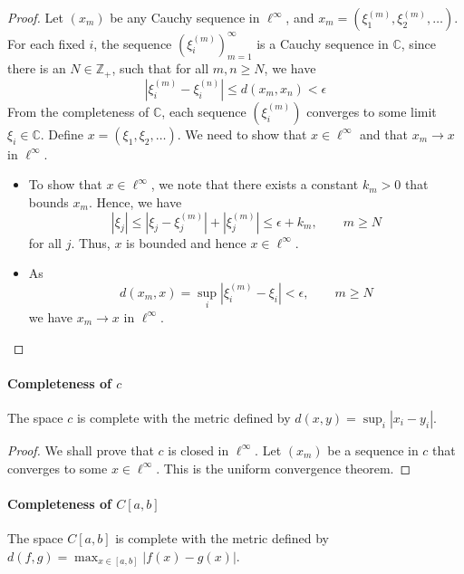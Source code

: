 \documentclass[../main.tex]{subfiles}
\begin{document}
\begin{proof}
	Let $(x_m)$ be any Cauchy sequence in $\ell^{\infty }$, and $x_m = (\xi_1^{(m)}, \xi_2^{(m)}, \ldots)$. For each fixed $i$, the sequence $(\xi_i^{(m)})_{m=1}^\infty$ is a Cauchy sequence in $\mathbb{C}$, since there is an $N\in \mathbb{Z}_+$, such that for all $m, n \geq N$, we have
	\begin{equation*}
		|\xi_i^{(m)} - \xi_i^{(n)}| \leq d(x_m, x_n) < \epsilon
	\end{equation*}
	From the completeness of $\mathbb{C}$, each sequence $(\xi_i^{(m)})$ converges to some limit $\xi_i \in \mathbb{C}$. Define $x = (\xi_1, \xi_2, \ldots)$. We need to show that $x \in \ell^{\infty }$ and that $x_m \to x$ in $\ell^{\infty }$.
	\begin{itemize}
		\item To show that $x \in \ell^{\infty }$, we note that there exists a constant $k_m>0$ that bounds $x_m$. Hence, we have
			\begin{equation*}
				|\xi_j| \leq |\xi_j-\xi_j^{(m)}| + |\xi_j^{(m)}| \leq \epsilon + k_m, \qquad m \geq N
			\end{equation*}
			for all $j$. Thus, $x$ is bounded and hence $x \in \ell^{\infty }$.
		\item As
			\begin{equation*}
				d(x_m, x) = \sup_{i} |\xi_i^{(m)} - \xi_i| < \epsilon, \qquad m \geq N
			\end{equation*}
			we have $x_m \to x$ in $\ell^{\infty }$.
	\end{itemize}
\end{proof}


\paragraph{Completeness of $c$} The space $c$ is complete with the metric defined by $d(x, y) = \sup_{i} |x_i - y_i|$.

\begin{proof}
	We shall prove that $c$ is closed in $\ell^{\infty }$. Let $(x_m)$ be a sequence in $c$ that converges to some $x \in \ell^{\infty }$. This is the uniform convergence theorem.
\end{proof}

\paragraph{Completeness of $C[a,b]$} The space $C[a,b]$ is complete with the metric defined by $d(f, g) = \max_{x \in [a, b]} |f(x) - g(x)|$.
\end{document}
